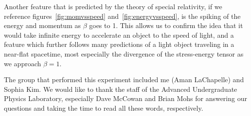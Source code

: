 \documentclass[reprint, nobibnotes, amssymb, amsmath, amsfonts, physics, mathtools, mathrsfs, floatfix]{revtex4-1}
\begin{document}
      \hspace{.25cm}

      Another feature that is predicted by the theory of special relativity, if we reference figures~\ref{fig:momvsspeed} and~\ref{fig:energyvsspeed}, is the spiking of the energy and momentum as $\beta$ goes to 1.  This allows us to confirm the idea that it would take infinite energy to accelerate an object to the speed of light, and a feature which further follows many predictions of a light object traveling in a near-flat spacetime, most especially the divergence of the stress-energy tensor as we approach $\beta = 1$.

      \hspace{.25cm}

      The group that performed this experiment included me (Aman LaChapelle) and Sophia Kim.  We would like to thank the staff of the Advanced Undergraduate Physics Laboratory, especially Dave McCowan and Brian Mohs for answering our questions and taking the time to read all these words, respectively.
\end{document}
